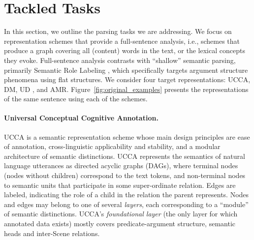 \documentclass[11pt,a4paper]{article}
\newcommand{\oa}[1]{\footnote{\color{red}OA: #1}}
\begin{document}
\section{Tackled Tasks}\label{sec:tasks}

In this section, we outline the parsing tasks we are addressing.
We focus on representation schemes that provide a full-sentence analysis,
i.e., schemes that produce a graph covering all (content) words in the text, 
or the lexical concepts they evoke.
Full-sentence analysis contrasts with ``shallow'' semantic parsing,
primarily Semantic Role Labeling
\cite[SRL;][]{Palmer:05,gildea2002automatic,swayamdipta2017frame,ringgaard2017sling},
which specifically targets argument structure phenomena using flat structures.
We consider four target representations: UCCA, DM, UD
\cite[Universal Dependencies; ][]{nivre2016universal}, and AMR.
Figure~\ref{fig:original_examples} presents the representations of the same sentence 
using each of the schemes.


\paragraph{Universal Conceptual Cognitive Annotation.}\label{sec:ucca}
UCCA \cite{abend2013universal} is a semantic representation scheme whose main design principles
are ease of annotation, cross-linguistic applicability and stability, and a modular architecture of semantic distinctions.
UCCA represents the semantics of natural language utterances
as directed acyclic graphs (DAGs), where terminal nodes (nodes without children)
correspond to the text tokens, and non-terminal nodes to semantic units that participate
in some super-ordinate relation.
Edges are labeled, indicating the role of a child in the relation the parent represents.
Nodes and edges may belong to one of several \textit{layers}, each corresponding
to a ``module'' of semantic distinctions.
UCCA's \textit{foundational layer} (the only layer for which annotated data exists) 
mostly covers predicate-argument structure, semantic heads and inter-Scene relations.
\end{document}

